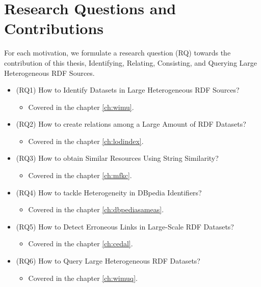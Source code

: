 \section{Research Questions and Contributions}\label{researchquestions}
For each motivation, we formulate a research question (RQ) towards the contribution of this thesis, Identifying, Relating, Consisting, and Querying Large Heterogeneous RDF Sources.

\begin{itemize}
    \item (RQ1) How to Identify Datasets in Large Heterogeneous RDF Sources? %
    \begin{itemize}
        \item Covered in the chapter \ref{ch:wimu}.
    \end{itemize}
    \item (RQ2) How to create relations among a Large Amount of RDF Datasets? %
    \begin{itemize}
        \item Covered in the chapter \ref{ch:lodindex}.
    \end{itemize}
    \item (RQ3) How to obtain Similar Resources Using String Similarity? %
    \begin{itemize}
        \item Covered in the chapter \ref{ch:mfkc}.
    \end{itemize}
    \item (RQ4) How to tackle Heterogeneity in DBpedia Identifiers? %
    \begin{itemize}
        \item Covered in the chapter \ref{ch:dbpediasameas}.
    \end{itemize}
    \item (RQ5) How to Detect Erroneous Links in Large-Scale RDF Datasets? %
    \begin{itemize}
        \item Covered in the chapter \ref{ch:cedal}.
    \end{itemize}
    \item (RQ6) How to Query Large Heterogeneous RDF Datasets? %
    \begin{itemize}
        \item Covered in the chapter \ref{ch:wimuq}.
    \end{itemize}
\end{itemize}

